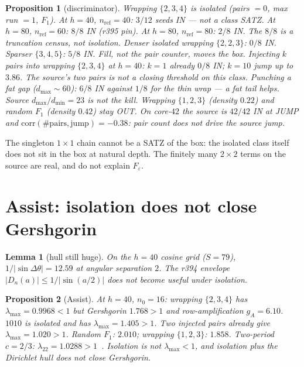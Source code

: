 \documentclass[11pt]{article}
\newtheorem{lemma}{Lemma}
\newtheorem{prop}{Proposition}
\theoremstyle{remark}
\begin{document}
\begin{prop}[discriminator]\label{prop:disc}
Wrapping $\{2,3,4\}$ is isolated (pairs $=0$, max run $=1$,
$F_1$).
At $h=40$, $n_{\mathrm{ref}}=40$: $3/12$ seeds IN --- not a
class SATZ.
At $h=80$, $n_{\mathrm{ref}}=60$: $8/8$ IN (r395 pin).
At $h=80$, $n_{\mathrm{ref}}=80$: $2/8$ IN.
The $8/8$ is a truncation census, not isolation.
Denser isolated wrapping $\{2,2,3\}$: $0/8$ IN.
Sparser $\{3,4,5\}$: $5/8$ IN.
Fill, not the pair counter, moves the box.
Injecting $k$ pairs into wrapping $\{2,3,4\}$ at $h=40$:
$k=1$ already $0/8$ IN; $k=10$ jump up to $3.86$.
The source's two pairs is not a closing threshold on this
class.
Punching a fat gap ($d_{\max}\sim 60$): $6/8$ IN against
$1/8$ for the thin wrap --- a fat tail \emph{helps}.
Source $d_{\max}/d_{\min}=23$ is not the kill.
Wrapping $\{1,2,3\}$ (density $0.22$) and random $F_1$
(density $0.42$) stay OUT.
On core-$42$ the source is $42/42$ IN at JUMP and
$\mathrm{corr}(\#\mathrm{pairs},\mathrm{jump})=-0.38$:
pair count does not drive the source jump.
\end{prop}

The singleton $1\times1$ chain cannot be a SATZ of the box:
the isolated class itself does not sit in the box at natural
depth.  The finitely many $2\times2$ terms on the source are
real, and do not explain $F_\varepsilon$.

\section{Assist: isolation does not close Gershgorin}\label{sec:assist}

\begin{lemma}[hull still huge]\label{lem:hull}
On the $h=40$ cosine grid ($S=79$),
$1/\lvert\sin\Delta\theta\rvert=12.59$ at angular separation
$2$.
The r394 envelope $\lvert D_n(a)\rvert\le 1/\lvert\sin(a/2)\rvert$
does not become useful under isolation.
\end{lemma}

\begin{prop}[Assist]\label{prop:assist}
At $h=40$, $n_0=16$: wrapping $\{2,3,4\}$ has
$\lambda_{\max}=0.9968<1$ but Gershgorin $1.768>1$ and
row-amplification $g_A=6.10$.
$1010$ is isolated and has $\lambda_{\max}=1.405>1$.
Two injected pairs already give $\lambda_{\max}=1.020>1$.
Random $F_1$: $2.010$; wrapping $\{1,2,3\}$: $1.858$.
Two-period $c=2/3$: $\lambda_{22}=1.0288>1$~\cite{r387,r394}.
Isolation is not $\lambda_{\max}<1$, and isolation plus the
Dirichlet hull does not close Gershgorin.
\end{prop}
\end{document}
